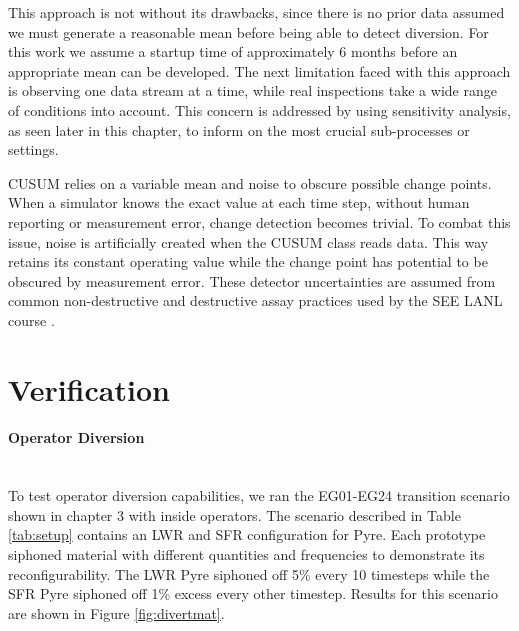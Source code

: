 This approach is not without its drawbacks, since there is no prior data assumed we must generate a reasonable mean before being able to detect diversion. For this work
we assume a startup time of approximately 6 months before an appropriate mean can be developed. The next limitation faced with this approach is observing one data stream at a time, while
real inspections take a wide range of conditions into account. This concern is addressed by using sensitivity analysis, as seen later in this chapter, to inform on the most crucial
sub-processes or settings. 

CUSUM relies on a variable mean and noise to obscure possible change points. When a simulator knows the exact value at each time step, without human reporting or measurement error, change 
detection becomes trivial. To combat this issue, noise is artificially created when the CUSUM class reads data. This way \Cyclus retains its constant operating value while the change point
has potential to be obscured by measurement error. These detector uncertainties are assumed from common non-destructive and destructive assay practices used by the SEE LANL course \cite{}.

\section{Verification}

\paragraph{Operator Diversion} \mbox{} \\

To test operator diversion capabilities, we ran the EG01-EG24 transition scenario shown in chapter 3 with inside operators. The scenario described in Table \ref{tab:setup} contains an LWR and SFR configuration for Pyre. Each prototype siphoned material with different quantities and frequencies to demonstrate its reconfigurability. The LWR Pyre siphoned off 5\% every 10 timesteps while the SFR Pyre siphoned off 1\% excess every other timestep.  Results for this scenario are shown in
Figure \ref{fig:divertmat}.

